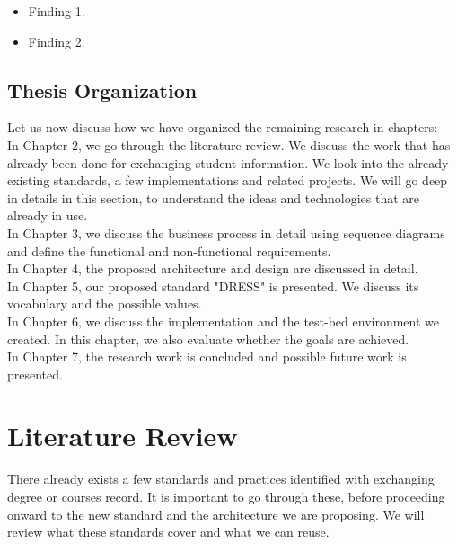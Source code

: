 \documentclass[12pt,a4paper,oneside]{book}
\begin{document}
\begin{itemize}
\item
Finding 1.
\item
Finding 2.
\end{itemize}

\section{Thesis Organization}\label{s-thesis-organization}

Let us now discuss how we have organized the remaining research in chapters: \\

In Chapter 2, we go through the literature review. We discuss the work that has already been done for exchanging student information. We look into the already existing standards, a few implementations and related projects. We will go deep in details in this section, to understand the ideas and technologies that are already in use. \\

In Chapter 3, we discuss the business process in detail using sequence diagrams and define the functional and non-functional requirements.  \\

In Chapter 4, the proposed architecture and design are discussed in detail. \\

In Chapter 5, our proposed standard "DRESS" is presented. We discuss its vocabulary and the possible values. \\

In Chapter 6, we discuss the implementation and the test-bed environment we created. In this chapter, we also evaluate whether the goals are achieved. \\

In Chapter 7, the research work is concluded and possible future work is presented.

\chapter{Literature Review}\label{ch-work}

There already exists a few standards and practices identified with exchanging degree or courses record. It is important to go through these, before proceeding onward to the new standard and the architecture we are proposing. We will review what these standards cover and what we can reuse.
\end{document}

